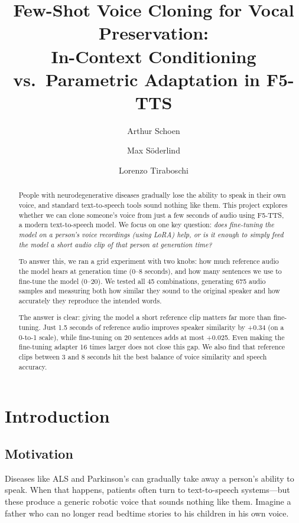 \documentclass[11pt, a4paper]{article}
\title{\textbf{Few-Shot Voice Cloning for Vocal Preservation:\\In-Context Conditioning vs.\ Parametric Adaptation in F5-TTS}}
\author{
  Arthur Schoen \and Max S\"oderlind \and Lorenzo Tiraboschi\\[6pt]
}
\date{}
\begin{document}
\maketitle

\begin{abstract}
People with neurodegenerative diseases gradually lose the ability to speak in their own voice, and standard text-to-speech tools sound nothing like them. This project explores whether we can clone someone's voice from just a few seconds of audio using F5-TTS, a modern text-to-speech model. We focus on one key question: \emph{does fine-tuning the model on a person's voice recordings (using LoRA) help, or is it enough to simply feed the model a short audio clip of that person at generation time?}

To answer this, we ran a grid experiment with two knobs: how much reference audio the model hears at generation time (0--8 seconds), and how many sentences we use to fine-tune the model (0--20). We tested all 45 combinations, generating 675 audio samples and measuring both how similar they sound to the original speaker and how accurately they reproduce the intended words.

The answer is clear: giving the model a short reference clip matters far more than fine-tuning. Just 1.5 seconds of reference audio improves speaker similarity by +0.34 (on a 0-to-1 scale), while fine-tuning on 20 sentences adds at most +0.025. Even making the fine-tuning adapter 16 times larger does not close this gap. We also find that reference clips between 3 and 8 seconds hit the best balance of voice similarity and speech accuracy.
\end{abstract}

\section{Introduction}

\subsection{Motivation}

Diseases like ALS and Parkinson's can gradually take away a person's ability to speak. When that happens, patients often turn to text-to-speech systems---but these produce a generic robotic voice that sounds nothing like them. Imagine a father who can no longer read bedtime stories to his children in his own voice.
\end{document}
